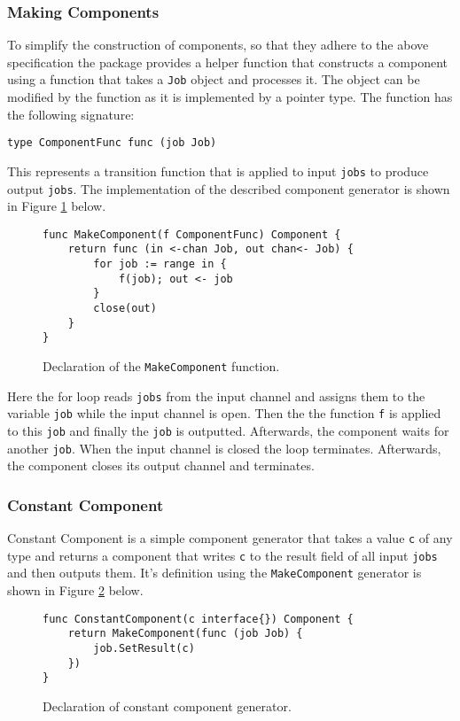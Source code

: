 \subsubsection{Making Components}
To simplify the construction of components, so that they adhere to 
the above specification the package provides a helper function that 
constructs a component using a function that takes a \texttt{Job} object 
and processes it. The object can be modified by the function as it is 
implemented by a pointer type. The function has the following signature:
\begin{lstlisting}
type ComponentFunc func (job Job)
\end{lstlisting}
This represents a transition function that is applied to input \texttt{jobs}
to produce output \texttt{jobs}.
The implementation of the described component generator is shown in 
Figure \ref{fig:MakeComponent} below.
\begin{figure}[h]
\centering
\begin{lstlisting}
func MakeComponent(f ComponentFunc) Component {
    return func (in <-chan Job, out chan<- Job) {
        for job := range in {
            f(job); out <- job
        }
        close(out)
    }
}
\end{lstlisting}
\caption[scale=1.0]{Declaration of the \texttt{MakeComponent} function.}
\label{fig:MakeComponent}
\end{figure}

Here the for loop reads \texttt{jobs} from the input channel and assigns them
to the variable \texttt{job} while the input channel is open. Then the 
the function \texttt{f} is applied to this \texttt{job} and finally 
the \texttt{job} is outputted.
Afterwards, the component waits for another \texttt{job}. When the input channel
is closed the loop terminates. Afterwards, the component closes its output channel
and terminates.

\subsubsection{Constant Component}
Constant Component is a simple component generator that takes a value \texttt{c}
of any type and returns a component that writes \texttt{c} to the result field of 
all input \texttt{jobs} and then outputs them. It's definition using the 
\texttt{MakeComponent} generator is shown in Figure 
\ref{fig:ConstantComponent} below.
\begin{figure}[h]
\centering
\begin{lstlisting}
func ConstantComponent(c interface{}) Component {
    return MakeComponent(func (job Job) {
        job.SetResult(c)
    })
}
\end{lstlisting}
\caption[scale=1.0]{Declaration of constant component generator.}
\label{fig:ConstantComponent}
\end{figure}

